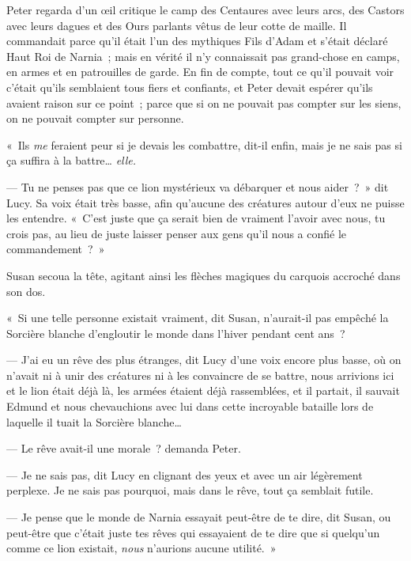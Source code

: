 Peter regarda d'un œil critique le camp des Centaures avec leurs arcs, des Castors avec leurs dagues et des Ours parlants vêtus de leur cotte de maille. Il commandait parce qu'il était l'un des mythiques Fils d'Adam et s'était déclaré Haut Roi de Narnia~; mais en vérité il n'y connaissait pas grand-chose en camps, en armes et en patrouilles de garde. En fin de compte, tout ce qu'il pouvait voir c'était qu'ils semblaient tous fiers et confiants, et Peter devait espérer qu'ils avaient raison sur ce point~; parce que si on ne pouvait pas compter sur les siens, on ne pouvait compter sur personne.

«~Ils \emph{me} feraient peur si je devais les combattre, dit-il enfin, mais je ne sais pas si ça suffira à la battre… \emph{elle.}

--- Tu ne penses pas que ce lion mystérieux va débarquer et nous aider~?~» dit Lucy. Sa voix était très basse, afin qu'aucune des créatures autour d'eux ne puisse les entendre. «~C'est juste que ça serait bien de vraiment l'avoir avec nous, tu crois pas, au lieu de juste laisser penser aux gens qu'il nous a confié le commandement~?~»

Susan secoua la tête, agitant ainsi les flèches magiques du carquois accroché dans son dos.

«~Si une telle personne existait vraiment, dit Susan, n'aurait-il pas empêché la Sorcière blanche d'engloutir le monde dans l'hiver pendant cent ans~?

--- J'ai eu un rêve des plus étranges, dit Lucy d'une voix encore plus basse, où on n'avait ni à unir des créatures ni à les convaincre de se battre, nous arrivions ici et le lion était déjà là, les armées étaient déjà rassemblées, et il partait, il sauvait Edmund et nous chevauchions avec lui dans cette incroyable bataille lors de laquelle il tuait la Sorcière blanche…

--- Le rêve avait-il une morale~? demanda Peter.

--- Je ne sais pas, dit Lucy en clignant des yeux et avec un air légèrement perplexe. Je ne sais pas pourquoi, mais dans le rêve, tout ça semblait futile.

--- Je pense que le monde de Narnia essayait peut-être de te dire, dit Susan, ou peut-être que c'était juste tes rêves qui essayaient de te dire que si quelqu'un comme ce lion existait, \emph{nous} n'aurions aucune utilité.~»


